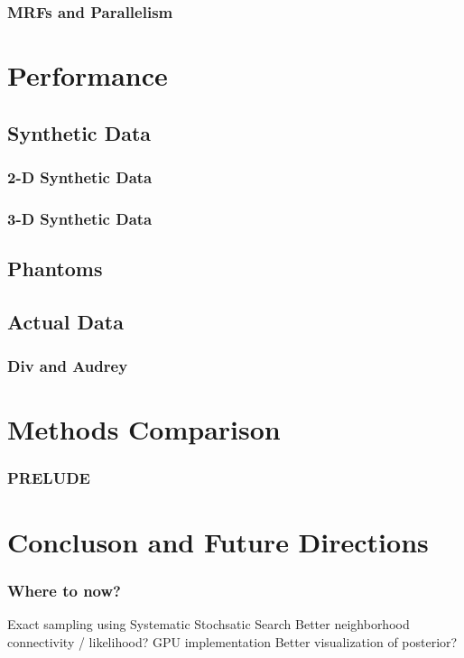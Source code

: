 \documentclass{beamer}
\begin{document}
\begin{frame}
  \frametitle{MRFs and Parallelism}
\end{frame}

\section{Performance}

\subsection{Synthetic Data}
\begin{frame}
  \frametitle{2-D Synthetic Data}
\end{frame}

\begin{frame}
  \frametitle{3-D Synthetic Data}
\end{frame}

\subsection{Phantoms}

\subsection{Actual Data}
\begin{frame}
  \frametitle{Div and Audrey}
\end{frame}

\section{Methods Comparison}
\begin{frame}
  \frametitle{PRELUDE}
\end{frame}

\section{Concluson and Future Directions}
\begin{frame}
  \frametitle{Where to now?}
  Exact sampling using Systematic Stochsatic Search
  Better neighborhood connectivity / likelihood? 
  GPU implementation 
  Better visualization of posterior?
\end{frame}
\end{document}
